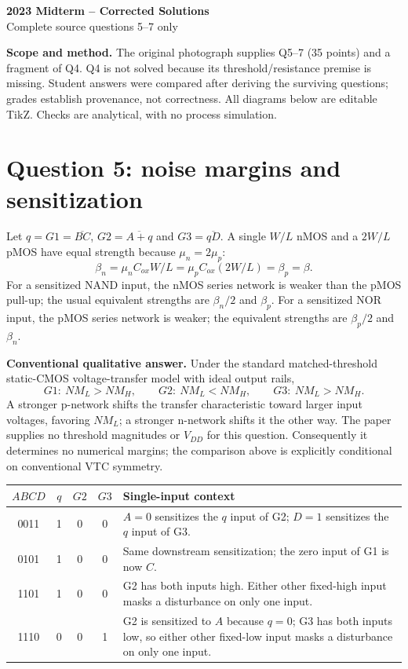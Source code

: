 \documentclass[10pt]{article}
\begin{document}
\begin{center}\large\textbf{2023 Midterm -- Corrected Solutions}\\\normalsize Complete source questions 5--7 only\end{center}
\textbf{Scope and method.} The original photograph supplies Q5--7 (35 points) and a fragment of Q4. Q4 is not solved because its threshold/resistance premise is missing. Student answers were compared after deriving the surviving questions; grades establish provenance, not correctness. All diagrams below are editable TikZ. Checks are analytical, with no process simulation.

\section*{Question 5: noise margins and sensitization}
Let $q=G1=\overline{BC}$, $G2=\overline{A+q}$ and $G3=\overline{qD}$. A single $W/L$ nMOS and a $2W/L$ pMOS have equal strength because $\mu_n=2\mu_p$:
\[\beta_n=\mu_nC_{ox}W/L=\mu_pC_{ox}(2W/L)=\beta_p=\beta.\]
For a sensitized NAND input, the nMOS series network is weaker than the pMOS pull-up; the usual equivalent strengths are $\beta_n/2$ and $\beta_p$. For a sensitized NOR input, the pMOS series network is weaker; the equivalent strengths are $\beta_p/2$ and $\beta_n$.

\textbf{Conventional qualitative answer.} Under the standard matched-threshold static-CMOS voltage-transfer model with ideal output rails,
\[\boxed{G1:\ NM_L>NM_H,\qquad G2:\ NM_L<NM_H,\qquad G3:\ NM_L>NM_H.}\]
A stronger p-network shifts the transfer characteristic toward larger input voltages, favoring $NM_L$; a stronger n-network shifts it the other way. The paper supplies no threshold magnitudes or $V_{DD}$ for this question. Consequently it determines no numerical margins; the comparison above is explicitly conditional on conventional VTC symmetry.

\begin{center}\begin{tabular}{ccccp{7.2cm}}\toprule
$ABCD$&$q$&$G2$&$G3$&Single-input context\\\midrule
0011&1&0&0&$A=0$ sensitizes the $q$ input of G2; $D=1$ sensitizes the $q$ input of G3.\\
0101&1&0&0&Same downstream sensitization; the zero input of G1 is now $C$.\\
1101&1&0&0&G2 has both inputs high. Either other fixed-high input masks a disturbance on only one input.\\
1110&0&0&1&G2 is sensitized to $A$ because $q=0$; G3 has both inputs low, so either other fixed-low input masks a disturbance on only one input.\\\bottomrule
\end{tabular}\end{center}
\end{document}
